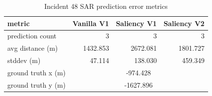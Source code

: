 \begin{table}[ht]
\centering
\caption{Incident 48 SAR prediction error metrics}
\label{tab:sar-incident-48}
\begin{tabular}{lrrr}
\hline
metric & Vanilla V1 & Saliency V1 & Saliency V2 \\
\hline
prediction count & 3 & 3 & 3 \\
avg distance (m) & 1432.853 & 2672.081 & 1801.727 \\
stddev (m) & 47.114 & 138.030 & 459.349 \\
ground truth x (m) & \multicolumn{3}{c}{-974.428} \\
ground truth y (m) & \multicolumn{3}{c}{-1627.896} \\
\hline
\end{tabular}
\end{table}
